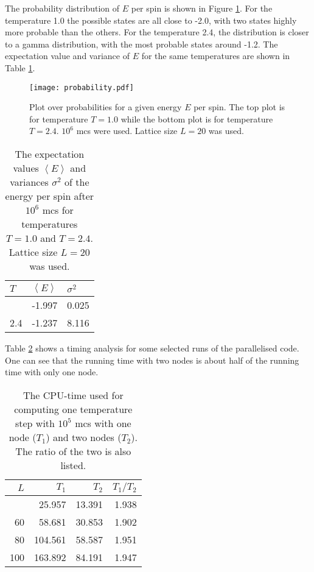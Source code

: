 The probability distribution of $E$ per spin is shown in Figure \ref{fig:prob}. For the temperature 1.0 the possible states are all close to -2.0, with two states highly more probable than the others. For the temperature 2.4, the distribution is closer to a gamma distribution, with the most probable states around -1.2. The expectation value and variance of $E$ for the same temperatures are shown in Table \ref{tab:prob}.
\begin{figure}[htbp]
	\centering
	\texttt{[image: probability.pdf]}
	\caption{Plot over probabilities for a given energy $E$ per spin. The top plot is for temperature $T = 1.0$ while the bottom plot is for temperature $T=2.4$. $10^6$ mcs were used. Lattice size $L=20$ was used.}
	\label{fig:prob}
\end{figure}
\begin{table}[htbp]
	\centering
	\begin{tabular}{lll}
		$T$   & $\left\langle E\right\rangle$  & $\sigma^2$ \\
		\hline
		\addlinespace[0.1cm]
		1.0   & -1.997 & 0.025 \\
		2.4 & -1.237  & 8.116
	\end{tabular}
	\caption{The expectation values  $\left\langle E\right\rangle$ and variances  $\sigma^2$ of the energy per spin after $10^6$ mcs for temperatures $T=1.0$ and $T=2.4$. Lattice size $L=20$ was used.}
	\label{tab:prob}
\end{table}

Table \ref{tab:timing} shows a timing analysis for some selected runs of the parallelised code. One can see that the running time with two nodes is about half of the running time with only one node.  
\begin{table}[htbp]
	\centering
	\begin{tabular}{rrrr}
		$L$   & $T_1$   & $T_2$  & $T_1/T_2$ \\
		\hline
		\addlinespace[0.1cm]
		40  & 25.957  & 13.391 & 1.938    \\
		60  & 58.681  & 30.853 & 1.902    \\
		80  & 104.561 & 58.587 & 1.951    \\
		100 & 163.892 & 84.191 & 1.947   
		\end{tabular}
	\caption{The CPU-time used for computing one temperature step with $10^5$ mcs with one node ($T_1$) and two nodes ($T_2$). The ratio of the two is also listed.}
	\label{tab:timing}
\end{table}

